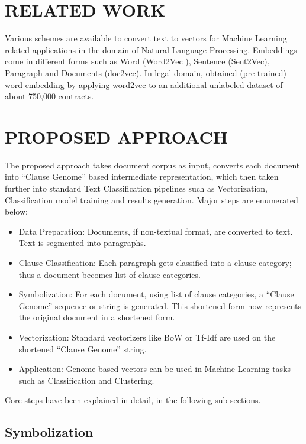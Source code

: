 \documentclass[9pt,academicons]{article}
\begin{document}
\section{RELATED WORK}
\label{sec:litsurvey}
Various schemes are available to convert text to vectors for Machine Learning related applications in the domain of Natural Language Processing. Embeddings come in different forms such as Word  (Word2Vec \cite{mikolov2013distributed}), Sentence (Sent2Vec), Paragraph and Documents (doc2vec). In legal domain, \cite{Chalkidis2017} obtained (pre-trained) word embedding by applying word2vec to an additional unlabeled dataset of about 750,000 contracts.

\section{PROPOSED APPROACH}
\label{sec:proposal}

The proposed approach takes document corpus as input, converts each document into ``Clause Genome'' based intermediate representation, which then taken further into standard Text Classification pipelines such as Vectorization, Classification model training and results generation. Major steps are enumerated below:

 \begin{itemize}
 \item Data Preparation: Documents, if non-textual format, are converted to text. Text is segmented into paragraphs.
  \item Clause Classification: Each paragraph gets classified into a clause category; thus a document becomes list of clause categories.
\item Symbolization: For each document, using list of clause categories, a ``Clause Genome'' sequence or string is generated. This shortened form now represents the original document in a shortened form.
\item Vectorization: Standard vectorizers like BoW or Tf-Idf are used on the shortened ``Clause Genome'' string.
\item Application: Genome based vectors can be used in Machine Learning tasks such as Classification and Clustering.
 \end{itemize}

Core steps have been explained in detail, in the following sub sections.

\subsection{Symbolization}
\label{subsec:symbolization}
\end{document}
